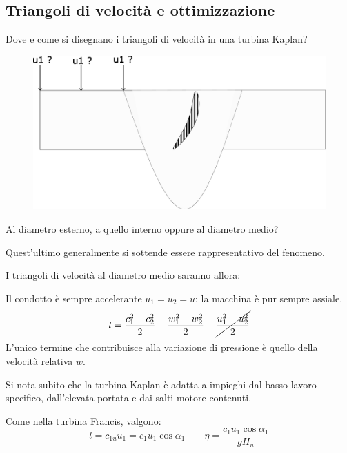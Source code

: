 \documentclass[a4paper, 15pt]{article}
\begin{document}
\newpage

\subsection{Triangoli di velocità e ottimizzazione}
\begin{adjustwidth}{2in}{}
	Dove e come si disegnano i triangoli di velocità in una turbina Kaplan?
	
\begin{figure}[H]
	\centering
	\includegraphics[width=0.7\linewidth]{inkscape/Kaplan1.pdf}
	\label{fig:kaplan1}
\end{figure}

	Al diametro esterno, a quello interno oppure al diametro medio? 
	
	Quest'ultimo generalmente si sottende essere rappresentativo del fenomeno. 
	
	I triangoli di velocità al diametro medio saranno allora: 
	

	Il condotto è sempre accelerante $u_1=u_2=u$: la macchina è pur sempre assiale.
	\[l = \dfrac{c_1^2-c_2^2}{2} - \dfrac{w_1^2-w_2^2}{2} + \cancel{\dfrac{u_1^2-u_2^2}{2}}\]
	L'unico termine che contribuisce alla variazione di pressione è quello della velocità relativa $w$. \newline 
	
	Si nota subito che la turbina Kaplan è adatta a impieghi dal basso lavoro specifico, dall'elevata portata e dai salti motore contenuti. \newline 
	
	Come nella turbina Francis, valgono:
	\[l = c_{1u}u_1 = c_1u_1\cos\alpha_1\qquad\eta=\dfrac{c_1u_1\cos\alpha_1}{gH_u}\]
\end{adjustwidth}
\end{document}
